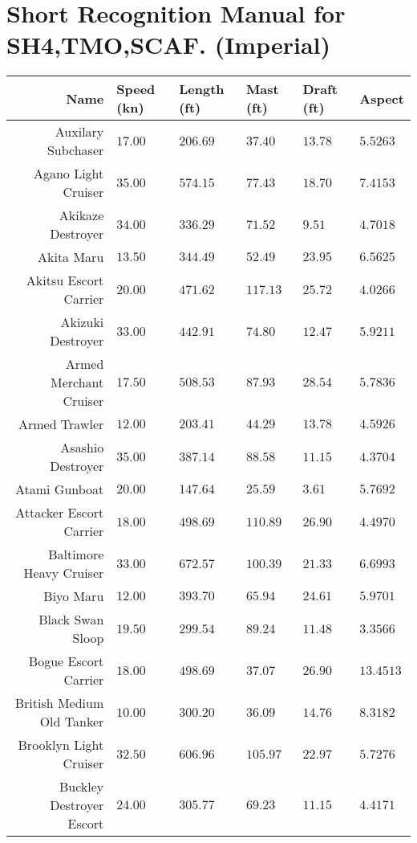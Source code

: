 \documentclass{article}
\begin{document}
\section*{Short Recognition Manual for SH4,TMO,SCAF. (Imperial)}
\centering
\begin{tabularx}{\textwidth}{|r|l|l|l|l|X|}
\hline
\textbf{Name} & \textbf{Speed (kn)} & \textbf{Length (ft)} & \textbf{Mast (ft)} & \textbf{Draft (ft)} & \textbf{Aspect}\\
\hline
 Auxilary Subchaser & $17.00$ & $206.69$ & $37.40$ & $13.78$ & $5.5263$ \\
\hline
Agano Light Cruiser & $35.00$ & $574.15$ & $77.43$ & $18.70$ & $7.4153$ \\
\hline
Akikaze Destroyer & $34.00$ & $336.29$ & $71.52$ & $9.51$ & $4.7018$ \\
\hline
Akita Maru & $13.50$ & $344.49$ & $52.49$ & $23.95$ & $6.5625$ \\
\hline
Akitsu Escort Carrier & $20.00$ & $471.62$ & $117.13$ & $25.72$ & $4.0266$ \\
\hline
Akizuki Destroyer & $33.00$ & $442.91$ & $74.80$ & $12.47$ & $5.9211$ \\
\hline
Armed Merchant Cruiser & $17.50$ & $508.53$ & $87.93$ & $28.54$ & $5.7836$ \\
\hline
Armed Trawler & $12.00$ & $203.41$ & $44.29$ & $13.78$ & $4.5926$ \\
\hline
Asashio Destroyer & $35.00$ & $387.14$ & $88.58$ & $11.15$ & $4.3704$ \\
\hline
Atami Gunboat & $20.00$ & $147.64$ & $25.59$ & $3.61$ & $5.7692$ \\
\hline
Attacker Escort Carrier & $18.00$ & $498.69$ & $110.89$ & $26.90$ & $4.4970$ \\
\hline
Baltimore Heavy Cruiser & $33.00$ & $672.57$ & $100.39$ & $21.33$ & $6.6993$ \\
\hline
Biyo Maru & $12.00$ & $393.70$ & $65.94$ & $24.61$ & $5.9701$ \\
\hline
Black Swan Sloop & $19.50$ & $299.54$ & $89.24$ & $11.48$ & $3.3566$ \\
\hline
Bogue Escort Carrier & $18.00$ & $498.69$ & $37.07$ & $26.90$ & $13.4513$ \\
\hline
British Medium Old Tanker & $10.00$ & $300.20$ & $36.09$ & $14.76$ & $8.3182$ \\
\hline
Brooklyn Light Cruiser & $32.50$ & $606.96$ & $105.97$ & $22.97$ & $5.7276$ \\
\hline
Buckley Destroyer Escort & $24.00$ & $305.77$ & $69.23$ & $11.15$ & $4.4171$ \\

\end{tabularx}
\end{document}
